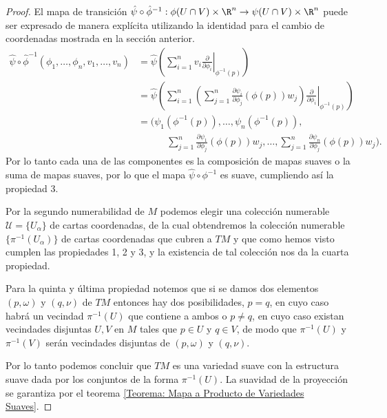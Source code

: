 \begin{proof}
	El mapa de transición $\hat{\psi} \circ \hat{\phi}^{-1}: \phi(U \cap V) \times \R^n \to \psi(U \cap V) \times \R^n$ puede ser expresado de manera explícita utilizando la identidad para el cambio de coordenadas mostrada en la sección anterior.
	\begin{align*}
		\hat{\psi} \circ \hat{\phi}^{-1}
		(\phi_1, \dots, \phi_n, v_1, \dots, v_n)
		 & =
		\hat{\psi} \left( \left.
		\sum_{i=1}^{n} v_i \frac{\partial}{\partial \phi_i}
		\right|_{\phi^{-1}(p)}\right)                      \\
		 & =
		\hat{\psi}\left(
		\sum_{i=1}^{n}
		\left(
		\sum_{j=1}^{n}
		\frac{\partial \psi_i}{\partial \phi_j} (\phi(p)) w_j
		\right)
		\left.
		\frac{\partial}{\partial \phi_i}
		\right|_{\phi^{-1}(p)}
		\right)
		\\
		 & =
		\Biggl(
		\psi_1(\phi^{-1}(p)), \dots, \psi_n(\phi^{-1}(p)), \\
		 & \quad \hspace{24pt}
		\sum_{j=1}^{n} \frac{\partial \psi_1}{\partial \phi_j}(\phi(p))w_j,
		\dots,
		\sum_{j=1}^{n} \frac{\partial \psi_n}{\partial \phi_j}(\phi(p))w_j
		\Biggr).
	\end{align*}
	Por lo tanto cada una de las componentes es la composición de mapas suaves o la suma de mapas suaves, por lo que el mapa $\hat{\psi} \circ \phi^{-1}$ es suave, cumpliendo así la propiedad 3.

	Por la segundo numerabilidad de $M$ podemos elegir una colección numerable $\mathcal{U} = \{U_\alpha\}$ de cartas coordenadas, de la cual obtendremos la colección numerable $\{\pi^{-1}(U_\alpha)\}$ de cartas coordenadas que cubren a $TM$ y que como hemos visto cumplen las propiedades 1, 2 y 3, y la existencia de tal colección nos da la cuarta propiedad.

	Para la quinta y última propiedad notemos que si se damos dos elementos $(p,\omega)$ y $(q, \nu)$ de $TM$ entonces hay dos posibilidades, $p = q$, en cuyo caso habrá un vecindad $\pi^{-1}(U)$ que contiene a ambos o $p \neq q$, en cuyo caso existan vecindades disjuntas $U,V$ en $M$ tales que $p \in U$ y $q \in V$, de modo que $\pi^{-1}(U)$ y $\pi^{-1}(V)$ serán vecindades disjuntas de $(p,\omega)$ y $(q,\nu)$.

	Por lo tanto podemos concluir que $TM$ es una variedad suave con la estructura suave dada por los conjuntos de la forma $\pi^{-1}(U)$. La suavidad de la proyección se garantiza por el teorema \ref{Teorema: Mapa a Producto de Variedades Suaves}.
\end{proof}

